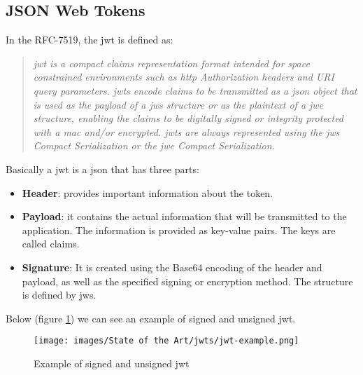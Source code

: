 \subsection{JSON Web Tokens}
In the RFC-7519\cite{rcf-jwt}, the \acrfull{jwt} is defined as:
\begin{quote}
    \textit{\acrfull{jwt} is a compact claims representation format intended for space constrained environments such as \acrshort{http} Authorization headers and URI query parameters.  \acrfull{jwt}s encode claims to be transmitted as a \acrshort{json} object that is used as the payload of a \acrfull{jws} structure or as the plaintext of a \acrfull{jwe} structure, enabling the claims to be digitally signed or integrity protected with a \acrfull{mac} and/or encrypted. \acrshort{jwt}s are always represented using the \acrshort{jws} Compact Serialization or the \acrshort{jwe} Compact Serialization.}
\end{quote}

Basically a \acrshort{jwt} is a \acrshort{json} that has three parts:
\begin{itemize}
    \item \textbf{Header}: provides important information about the token.
    \item \textbf{Payload}: it contains the actual information that will be transmitted to the application. The information is provided as key-value pairs. The keys are called claims.
    \item \textbf{Signature}: It is created using the Base64 encoding of the header and payload, as well as the specified signing or encryption method. The structure is defined by \acrfull{jws}.
\end{itemize}
Below (figure \ref{fig:jwt-ex}) we can see an example of signed and unsigned \acrshort{jwt}.
\begin{figure}[h]
    \centering
    \texttt{[image: images/State of the Art/jwts/jwt-example.png]}
    \caption{Example of signed and unsigned \acrshort{jwt}}
    \label{fig:jwt-ex}
\end{figure}
